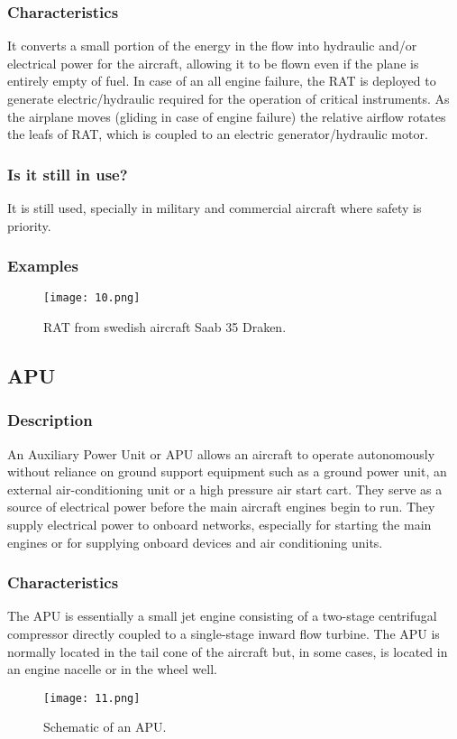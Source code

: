 \documentclass[12pt, letterpaper]{article}
\begin{document}
\subsubsection*{Characteristics}
It converts a small portion of the energy in the flow into hydraulic and/or electrical power for the aircraft, allowing it to be flown even if the plane is entirely empty of fuel. \autocite{wt08}
In case of an all engine failure, the RAT is deployed to generate electric/hydraulic required for the operation of critical instruments. As the airplane moves (gliding in case of engine failure) the relative airflow rotates the leafs of RAT, which is coupled to an electric generator/hydraulic motor.
\subsubsection*{Is it still in use?}
It is still used, specially in military and commercial aircraft where safety is priority.
\subsubsection*{Examples}
\begin{figure}[H]
	\centering
	\texttt{[image: 10.png]}
	\caption{RAT from swedish aircraft Saab 35 Draken.}
\end{figure}

\subsection*{APU}

\subsubsection*{Description}
An Auxiliary Power Unit or APU allows an aircraft to operate autonomously without reliance on ground support equipment such as a ground power unit, an external air-conditioning unit or a high pressure air start cart. They serve as a source of electrical power before the main aircraft engines begin to run. They supply electrical power to onboard networks, especially for starting the main engines or for supplying onboard devices and air conditioning units.\autocite{skybrary17} \autocite{pbs01}

\subsubsection*{Characteristics}
The APU is essentially a small jet engine consisting of a two-stage centrifugal compressor directly coupled to a single-stage inward flow turbine. The APU is normally located in the tail cone of the aircraft but, in some cases, is located in an engine nacelle or in the wheel well.
\begin{figure}[H]
	\centering
	\texttt{[image: 11.png]}
	\caption{Schematic of an APU.}
\end{figure}
\end{document}

